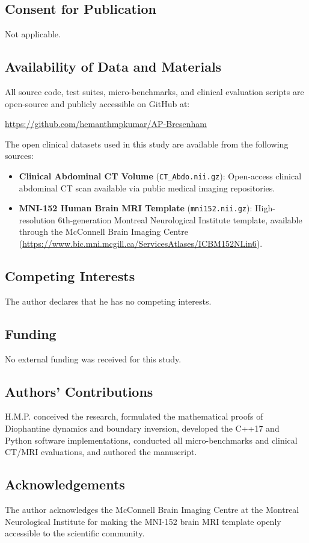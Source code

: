 \documentclass[11pt]{article}
\begin{document}
\subsection*{Consent for Publication}
Not applicable.

\subsection*{Availability of Data and Materials}
All source code, test suites, micro-benchmarks, and clinical evaluation scripts are open-source and publicly accessible on GitHub at:
\begin{center}
\url{https://github.com/hemanthmpkumar/AP-Bresenham}
\end{center}
The open clinical datasets used in this study are available from the following sources:
\begin{itemize}
    \item \textbf{Clinical Abdominal CT Volume} (\texttt{CT\_Abdo.nii.gz}): Open-access clinical abdominal CT scan available via public medical imaging repositories.
    \item \textbf{MNI-152 Human Brain MRI Template} (\texttt{mni152.nii.gz}): High-resolution 6th-generation Montreal Neurological Institute template, available through the McConnell Brain Imaging Centre (\url{https://www.bic.mni.mcgill.ca/ServicesAtlases/ICBM152NLin6}).
\end{itemize}

\subsection*{Competing Interests}
The author declares that he has no competing interests.

\subsection*{Funding}
No external funding was received for this study.

\subsection*{Authors' Contributions}
H.M.P. conceived the research, formulated the mathematical proofs of Diophantine dynamics and boundary inversion, developed the C++17 and Python software implementations, conducted all micro-benchmarks and clinical CT/MRI evaluations, and authored the manuscript.

\subsection*{Acknowledgements}
The author acknowledges the McConnell Brain Imaging Centre at the Montreal Neurological Institute for making the MNI-152 brain MRI template openly accessible to the scientific community.
\end{document}

